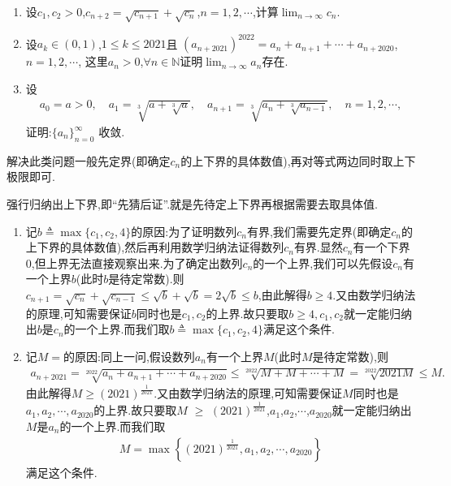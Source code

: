 \documentclass[../../main.tex]{subfiles}%
\begin{document}
\begin{example}[类递增模型]\label{example:类递增模型}
\begin{enumerate}
\item 设\(c_1,c_2 > 0\),\(c_{n + 2} = \sqrt{c_{n + 1}} + \sqrt{c_{n}}\),\(n = 1,2,\cdots\),计算\(\lim_{n \to \infty} c_{n}\).

\item 设\(a_k \in (0,1)\),\(1 \leqslant  k \leqslant  2021\)且
\((a_{n + 2021})^{2022} = a_{n} + a_{n + 1} + \cdots + a_{n + 2020}\),\(n = 1,2,\cdots\),
这里\(a_{n} > 0\),\(\forall n \in \mathbb{N}\)证明\(\lim_{n \to \infty} a_{n}\)存在.

\item 设
\begin{align*}
a_0 = a > 0,\quad a_1 = \sqrt[3]{a + \sqrt[3]{a}},\quad a_{n+1} = \sqrt[3]{a_n + \sqrt[3]{a_{n-1}}},\quad n = 1,2,\cdots,
\end{align*}
证明:$\{a_n\}_{n=0}^{\infty}$ 收敛.
\end{enumerate}
\end{example}
\begin{note}
解决此类问题一般先定界(即确定$c_n$的上下界的具体数值),再对等式两边同时取上下极限即可.
\end{note}
\begin{remark}
强行归纳出上下界,即“先猜后证”.就是先待定上下界再根据需要去取具体值.
\begin{enumerate}
\item \label{example3.23-1}记\(b\triangleq\max\{c_1,c_2,4\}\)的原因:为了证明数列${c_n}$有界,我们需要先定界(即确定$c_n$的上下界的具体数值),然后再利用数学归纳法证得数列${c_n}$有界.显然${c_n}$有一个下界0,但上界无法直接观察出来.为了确定出数列${c_n}$的一个上界,我们可以先假设${c_n}$有一个上界$b$(此时$b$是待定常数).则$c_{n+1}=\sqrt{c_n}+\sqrt{c_{n - 1}}\leqslant\sqrt{b}+\sqrt{b}=2\sqrt{b}\leqslant b$,由此解得$b\geqslant  4$.又由数学归纳法的原理,可知需要保证$b$同时也是$c_1,c_2$的上界.故只要取$b\geqslant  4,c_1,c_2$就一定能归纳出$b$是${c_n}$的一个上界.而我们取$b\triangleq\max\{c_1,c_2,4\}$满足这个条件.

\item \label{example3.23-2}记$M=$的原因:同上一问,假设数列${a_n}$有一个上界$M$(此时$M$是待定常数),则
\begin{align*}
a_{n+2021}=\sqrt[2022]{a_n+a_{n+1}+\cdots +a_{n+2020}}\leqslant \sqrt[2022]{M+M+\cdots +M}=\sqrt[2022]{2021M}\leqslant M.
\end{align*}
由此解得$M\geqslant  (2021)^{\frac{1}{2021}}$.又由数学归纳法的原理,可知需要保证$M$同时也是$a_1,a_2,\cdots,a_{2020}$的上界.故只要取$M$ $\geqslant$  $\left(2021\right)^{\frac{1}{2021}}$,$a_1$,$a_2$,$\cdots$,$a_{2020}$就一定能归纳出$M$是${a_n}$的一个上界.而我们取
\begin{align*}
M=\max \left\{ \left( 2021 \right) ^{\frac{1}{2021}},a_1,a_2,\cdots ,a_{2020} \right\} 
\end{align*}
满足这个条件.
\end{enumerate}
\end{remark}
\end{document}
